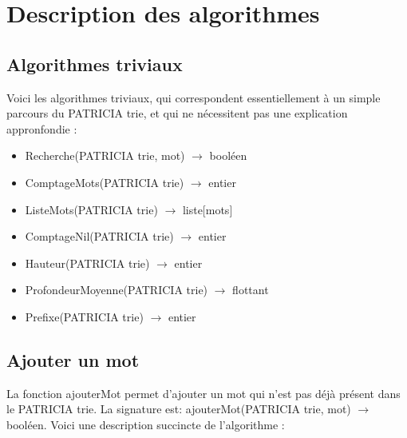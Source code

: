\documentclass[a4paper,12pt]{report}
\begin{document}
\section{Description des algorithmes}
\subsection{Algorithmes triviaux}
Voici les algorithmes triviaux, qui correspondent essentiellement à un simple parcours du PATRICIA trie, et qui ne nécessitent pas une explication appronfondie :
\begin{itemize}
 \item Recherche(PATRICIA trie, mot) $\rightarrow$ booléen
 \item ComptageMots(PATRICIA trie) $\rightarrow$ entier
 \item ListeMots(PATRICIA trie) $\rightarrow$ liste[mots]
 \item ComptageNil(PATRICIA trie) $\rightarrow$ entier
 \item Hauteur(PATRICIA trie) $\rightarrow$ entier
 \item ProfondeurMoyenne(PATRICIA trie) $\rightarrow$ flottant
 \item Prefixe(PATRICIA trie) $\rightarrow$ entier
\end{itemize}

\subsection{Ajouter un mot}
La fonction ajouterMot permet d'ajouter un mot qui n'est pas déjà présent dans le PATRICIA trie. La signature est: ajouterMot(PATRICIA trie, mot) $\rightarrow$ booléen.
Voici une description succincte de l'algorithme :
\end{document}
